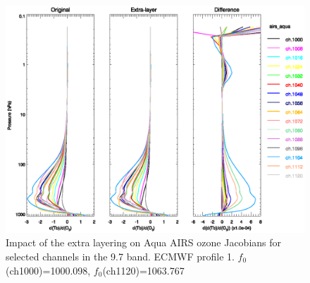 \begin{figure}[htp]
  \centering
  \includegraphics[scale=0.8]{graphics/airs_aqua.o3_k_el.p1.eps}
  \caption{Impact of the extra layering on Aqua AIRS ozone Jacobians for selected channels in the 9.7\micron{} \ozone{} band. ECMWF profile 1. $f_{0}$(ch1000)=1000.098\invcm, $f_{0}$(ch1120)=1063.767\invcm }
  \label{fig:airs_aqua.o3_k_el.p1}
\end{figure}



	






